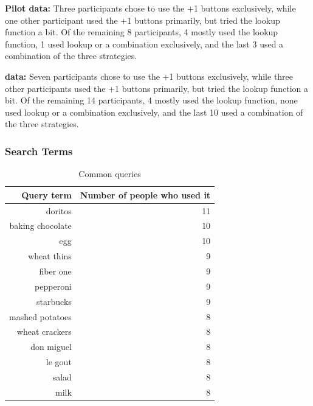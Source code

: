  \textbf{Pilot data:}
Three participants chose to use the +1 buttons exclusively, while one other participant used the +1 buttons primarily, but tried the lookup function a bit. Of the remaining 8 participants, 4 mostly used the lookup function, 1 used lookup or a combination exclusively, and the last 3 used a combination of the three strategies. 

\textbf{data:}
Seven participants chose to use the +1 buttons exclusively, while three other participants used the +1 buttons primarily, but tried the lookup function a bit. Of the remaining 14 participants, 4 mostly used the lookup function,  none used lookup or a combination exclusively, and the last 10 used a combination of the three strategies. 


\subsubsection{Search Terms}
\begin{table}[bthp]
\small
  \centering
  \caption{Common queries}
    \begin{tabular}{rr}
    \toprule
    Query term & Number of people who used it \\
    \midrule
    doritos & 11 \\
    baking chocolate & 10 \\
    egg   & 10 \\
    wheat thins & 9 \\
    fiber one & 9 \\
    pepperoni & 9 \\
    starbucks & 9 \\
    mashed potatoes & 8 \\
    wheat crackers & 8 \\
    don miguel & 8 \\
    le gout & 8 \\
    salad & 8 \\
    milk  & 8 \\
    \bottomrule
    \end{tabular}%
  \label{tab:inlab_commonqueries}%
\end{table}%


